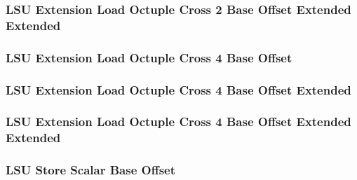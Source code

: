 \subsubsection[{\small LSU Extension Load Octuple Cross 2 Base Offset Extended Extended}]{LSU Extension Load Octuple Cross 2 Base Offset Extended Extended} \label{sec:format-LSU-XLOC2BO.Y}



\subsubsection[{\small LSU Extension Load Octuple Cross 4 Base Offset}]{LSU Extension Load Octuple Cross 4 Base Offset} \label{sec:format-LSU-XLOC4BO}



\subsubsection[{\small LSU Extension Load Octuple Cross 4 Base Offset Extended}]{LSU Extension Load Octuple Cross 4 Base Offset Extended} \label{sec:format-LSU-XLOC4BO.X}



\subsubsection[{\small LSU Extension Load Octuple Cross 4 Base Offset Extended Extended}]{LSU Extension Load Octuple Cross 4 Base Offset Extended Extended} \label{sec:format-LSU-XLOC4BO.Y}



\subsubsection[{\small LSU Store Scalar Base Offset}]{LSU Store Scalar Base Offset} \label{sec:format-LSU-SSBO}



